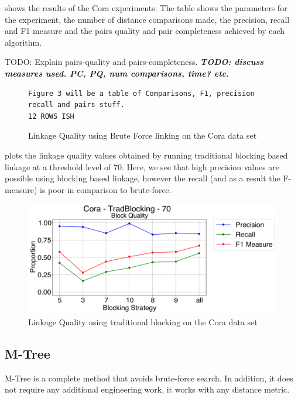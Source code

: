 \documentclass{llncs}
\begin{document}
 shows the results of the Cora experiments. The table shows the parameters for the experiment, the number of distance comparisons made, the precision, recall and F1 measure and the pairs quality and pair completeness achieved by each algorithm.  


TODO: Explain pairs-quality and pairs-completeness.
\emph{\textbf{TODO: discuss measures used. PC, PQ, num comparisons, time? etc.}}

\begin{figure}
\begin{verbatim}
Figure 3 will be a table of Comparisons, F1, precision recall and pairs stuff.
12 ROWS ISH
\end{verbatim}
\caption{Linkage Quality using Brute Force linking on the Cora data set\label{comparison-of-results}}
\end{figure}





 plots the linkage quality values obtained by running traditional blocking based linkage at a threshold level of 70. Here, we see that high precision values are possible using blocking based linkage, however the recall (and as a result the F-measure) is poor in comparison to brute-force.

\begin{figure}
\includegraphics[width=\textwidth]{figures/plotFixedThresholdTraditional1_--_Cora_-_TradBlocking_-_70}
\caption{Linkage Quality using traditional blocking on the Cora data set\label{cora-traditional-prf}}
\end{figure}




\subsection{M-Tree}

M-Tree is a complete method that avoids brute-force search.
In addition, it does not require any additional engineering work, it works with any distance metric.
\end{document}
